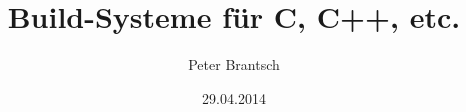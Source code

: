 \title[Build-Systeme]{Build-Systeme für C, C++, etc.}
\author{Peter Brantsch}
\date{29.04.2014}
\frame[plain]{\titlepage}

